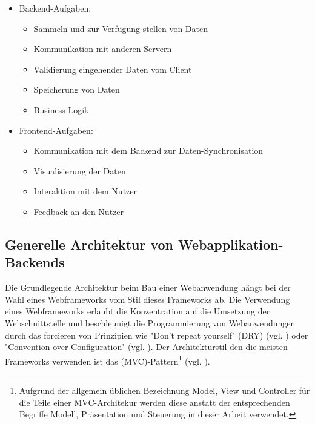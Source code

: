 \begin{itemize}
  \item Backend-Aufgaben:
  \begin{itemize}
    \item Sammeln und zur Verfügung stellen von Daten
    \item Kommunikation mit anderen Servern
    \item Validierung eingehender Daten vom Client
    \item Speicherung von Daten
    \item Business-Logik
  \end{itemize}

\item Frontend-Aufgaben:
  \begin{itemize}
    \item Kommunikation mit dem Backend zur Daten-Synchronisation 
\item Visualisierung der Daten
    \item Interaktion mit dem Nutzer
    \item Feedback an den Nutzer
  \end{itemize}
\end{itemize}

\subsection{Generelle Architektur von Webapplikation-Backends}

Die Grundlegende Architektur beim Bau einer Webanwendung hängt bei der Wahl eines Webframeworks vom Stil dieses Frameworks ab. Die Verwendung eines Webframeworks erlaubt die Konzentration auf die Umsetzung der Webschnittstelle und beschleunigt die Programmierung von Webanwendungen durch das forcieren von Prinzipien wie "Don't repeat yourself" (DRY) (vgl. \cite[p.~23]{pragmatic-programmer}) oder "Convention over Configuration" (vgl. \cite[p.~3]{maven}). Der Architekturstil den die meisten Frameworks verwenden ist das  (MVC)-Pattern\footnote{Aufgrund der allgemein üblichen Bezeichnung Model, View und Controller für die Teile einer MVC-Architekur werden diese anstatt der entsprechenden Begriffe Modell, Präsentation und Steuerung in dieser Arbeit verwendet.} (vgl. \cite[p.~14]{gang-of-four}). 

